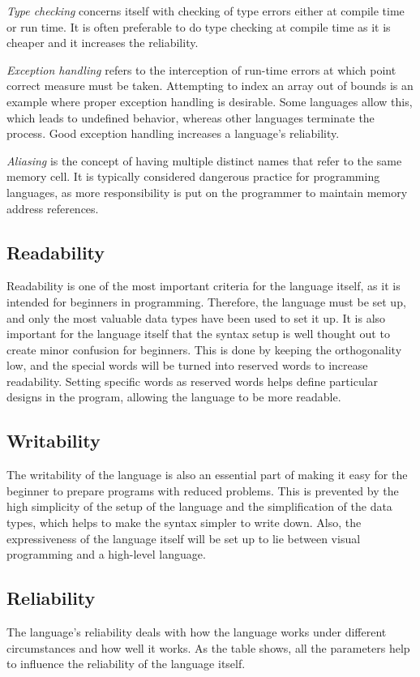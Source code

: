 \textit{Type checking} concerns itself with checking of type errors either at compile time or run time. 
It is often preferable to do type checking at compile time as it is cheaper and it increases the reliability.

\textit{Exception handling} refers to the interception of run-time errors at which point correct measure must be taken. 
Attempting to index an array out of bounds is an example where proper exception handling is desirable.
Some languages allow this, which leads to undefined behavior, whereas other languages terminate the process.
Good exception handling increases a language's reliability.

\textit{Aliasing} is the concept of having multiple distinct names that refer to the same memory cell. 
It is typically considered dangerous practice for programming languages, as more responsibility is put on the programmer to maintain memory address references.


\subsection{Readability}
Readability is one of the most important criteria for the language itself, as it is intended for beginners in programming. 
Therefore, the language must be set up, and only the most valuable data types have been used to set it up. It is also important for the language itself that the syntax setup is well thought out to create minor confusion for beginners.
This is done by keeping the orthogonality low, and the special words will be turned into reserved words to increase readability. 
Setting specific words as reserved words helps define particular designs in the program, allowing the language to be more readable.

\subsection{Writability}

The writability of the language is also an essential part of making it easy for the beginner to prepare programs with reduced problems. 
This is prevented by the high simplicity of the setup of the language and the simplification of the data types, which helps to make the syntax simpler to write down.
Also, the expressiveness of the language itself will be set up to lie between visual programming and a high-level language.

\subsection{Reliability}
The language's reliability deals with how the language works under different circumstances and how well it works. 
As the table shows, all the parameters help to influence the reliability of the language itself.
